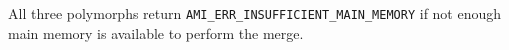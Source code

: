 All three polymorphs return \verb|AMI_ERR_INSUFFICIENT_MAIN_MEMORY| if not
enough main memory is available to perform the merge.


%
%
%
%
%
%


